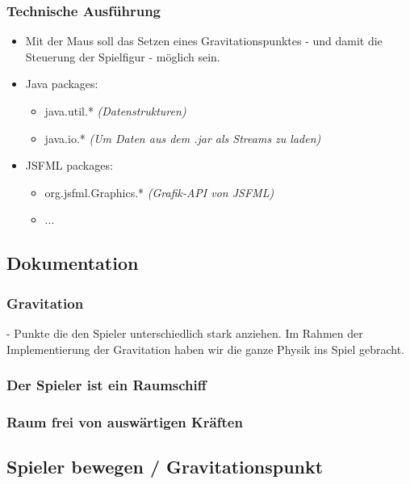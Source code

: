 \documentclass[12pt,a4paper]{scrartcl}
\begin{document}
\subsubsection{Technische Ausführung}
\begin{itemize}
\item Mit der Maus soll das Setzen eines Gravitationspunktes - und damit die Steuerung der Spielfigur - möglich sein.
\item Java packages: \begin{itemize}
	\item java.util.* \textit{(Datenstrukturen)}
	\item java.io.* \textit{(Um Daten aus dem .jar als Streams zu laden)}
\end{itemize}
\item JSFML packages: \begin{itemize}
	\item org.jsfml.Graphics.* \textit{(Grafik-API von JSFML)}
	\item ...
\end{itemize}
\end{itemize}

\subsection{Dokumentation}

\subsubsection{Gravitation}
- Punkte die den Spieler unterschiedlich stark anziehen.
Im Rahmen der Implementierung der Gravitation haben wir die ganze Physik ins Spiel gebracht.

\subsubsection{Der Spieler ist ein Raumschiff}

\subsubsection{Raum frei von auswärtigen Kräften}

\subsection{Spieler bewegen / Gravitationspunkt}
\end{document}
